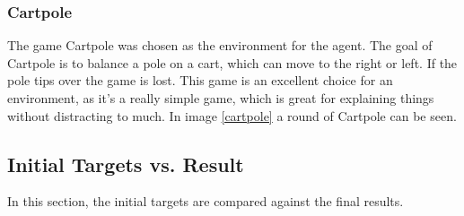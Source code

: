 \documentclass[10pt,a4paper]{article}
\begin{document}
		\subsubsection{Cartpole}
			The game Cartpole was chosen as the environment for the agent. The goal of Cartpole is to balance a pole on a cart, which can move to the right or left. If the pole tips over the game is lost. This game is an excellent choice for an environment, as it's a really simple game, which is great for explaining things without distracting to much.
			In image \ref{cartpole} a round of Cartpole can be seen.
			
	\subsection{Initial Targets vs. Result}
	
		In this section, the initial targets are compared against the final results.
		
\end{document}
